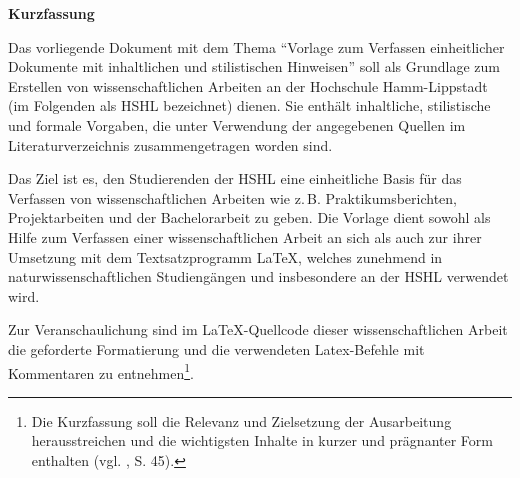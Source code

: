 \noindent
\textbf{\Large{Kurzfassung}}

\vspace*{0.5 cm}

\noindent
Das vorliegende Dokument mit dem Thema "`Vorlage zum Verfassen einheitlicher Dokumente mit inhaltlichen und
stilistischen Hinweisen"' soll als Grundlage zum Erstellen von wissenschaftlichen Arbeiten an der Hochschule Hamm-Lippstadt (im Folgenden als HSHL bezeichnet) dienen.
Sie enthält inhaltliche, stilistische und formale Vorgaben, die unter Verwendung der angegebenen Quellen im Literaturverzeichnis zusammengetragen worden sind.

Das Ziel ist es, den Studierenden der HSHL eine einheitliche Basis für das Verfassen von wissenschaftlichen Arbeiten wie z.\,B. Praktikumsberichten, Projektarbeiten und der Bachelorarbeit zu geben.
Die Vorlage dient sowohl als Hilfe zum Verfassen einer wissenschaftlichen Arbeit an sich als auch zur ihrer Umsetzung mit dem Textsatzprogramm \LaTeX, welches zunehmend in naturwissenschaftlichen Studiengängen und insbesondere an der HSHL verwendet wird.

Zur Veranschaulichung sind im LaTeX-Quellcode dieser wissenschaftlichen Arbeit die geforderte Formatierung und die verwendeten Latex-Befehle mit Kommentaren zu entnehmen\footnote{Die Kurzfassung soll die Relevanz und Zielsetzung der Ausarbeitung herausstreichen und die wichtigsten Inhalte in kurzer und prägnanter Form enthalten (vgl. \cite{Karm2011}, S. 45).}.
